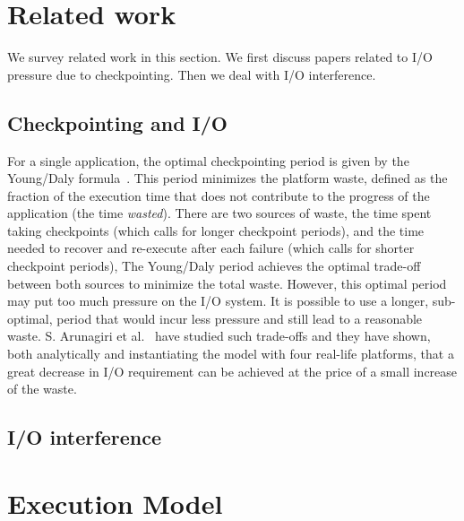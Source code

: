 \documentclass{article}
\begin{document}
\section{Related work}
\label{sec.related}

We survey related work in this section. We first discuss papers related to I/O pressure 
due to checkpointing. Then we deal with I/O interference.

\subsection{Checkpointing and I/O}

For a single application, the optimal checkpointing period is given by the Young/Daly
formula~\cite{young74,daly04}. This period minimizes the platform waste, defined as 
the fraction of the
execution time that does not contribute to the progress of the application (the
time \emph{wasted}).  There are two sources of waste, the time spent taking checkpoints
(which calls for longer checkpoint periods),
and the time needed to recover and re-execute after each failure
(which calls for shorter checkpoint periods),
The Young/Daly
period achieves the optimal trade-off between both sources to minimize the 
total waste.
However, this optimal period may put too much pressure 
on the I/O system. It is possible to use a longer, sub-optimal, period that would incur
less pressure and still lead to a reasonable waste. S. Arunagiri et al.~\cite{Arunagiri2009} have studied such trade-offs and they have shown, both analytically and instantiating the model with four real-life platforms,
that a great decrease in I/O requirement can be achieved  at the price of a small increase of the waste.

\subsection{I/O interference}


\section{Execution Model}
\label{sec.model}

\end{document}
